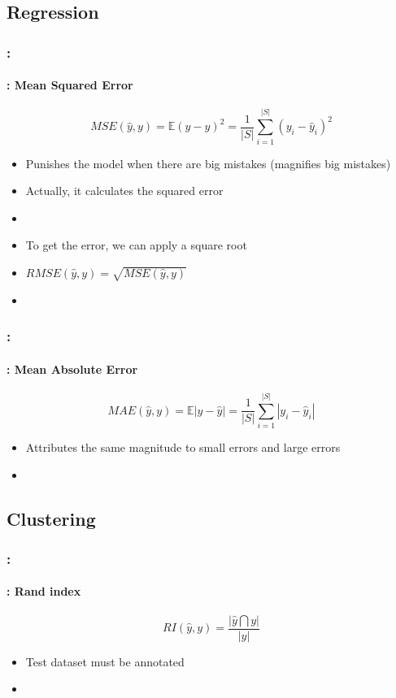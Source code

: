 \documentclass[xcolor=table]{beamer}
\begin{document}
\subsection{Regression}

\begin{frame}
	\frametitle{\insertshortsubtitle: \insertsection}
	\framesubtitle{\insertsubsection: Mean Squared Error}
	
	\[MSE(\hat{y}, y) = \mathbb{E}(y - \hat{y})^2 =  \frac{1}{|S|} \sum_{i=1}^{|S|} (y_i - \hat{y}_i)^2\]

	\begin{itemize}
		\item Punishes the model when there are big mistakes (magnifies big mistakes)
		\item Actually, it calculates the squared error
		\item {}
		\item To get the error, we can apply a square root
		\item $RMSE(\hat{y}, y) = \sqrt{MSE(\hat{y}, y)}$
		\item {}
	\end{itemize}
	
\end{frame}

\begin{frame}
	\frametitle{\insertshortsubtitle: \insertsection}
	\framesubtitle{\insertsubsection: Mean Absolute Error}
	
	\[MAE(\hat{y}, y) = \mathbb{E}|y - \hat{y}| =  \frac{1}{|S|} \sum_{i=1}^{|S|} |y_i - \hat{y}_i|\]
	
	\begin{itemize}
		\item Attributes the same magnitude to small errors and large errors 
		\item {}
	\end{itemize}
	
\end{frame}

\subsection{Clustering}

\begin{frame}
	\frametitle{\insertshortsubtitle: \insertsection}
	\framesubtitle{\insertsubsection: Rand index}
	
	\[RI(\hat{y}, y) = \frac{|\hat{y} \bigcap y|}{|y|}\]
	
	\begin{itemize}
		\item Test dataset must be annotated
		\item {}
	\end{itemize}
	
\end{frame}
\end{document}
